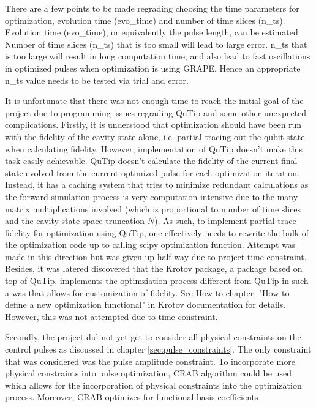 \documentclass[12pt]{report}
\begin{document}
There are a few points to be made regrading choosing the time parameters for optimization, evolution time (evo\_time) and number of time slices (n\_ts).
Evolution time (evo\_time), or equivalently the pulse length, can be estimated %
Number of time slices (n\_ts) that is too small will lead to large error. 
n\_ts that is too large will result in long computation time; and also lead to fast oscillations in optimized pulses when optimization is using GRAPE.
Hence an appropriate n\_ts value needs to be tested via trial and error.
\par
It is unfortunate that there was not enough time to reach the initial goal of the project due to programming issues regrading QuTip and some other unexpected complications.
Firstly, it is understood that optimization should have been run with the fidelity of the cavity state alone, i.e. partial tracing out the qubit state when calculating fidelity. 
However, implementation of QuTip doesn't make this task easily achievable. QuTip doesn't calculate the fidelity of the current final state evolved from the current optimized pulse for each optimization iteration. 
Instead, it has a caching system that tries to minimize redundant calculations as the forward simulation process is very computation intensive due to the many matrix multiplications involved (which is proportional to number of time slices and the cavity state space truncation $N$).
As such, to implement partial trace fidelity for optimization using QuTip, one effectively needs to rewrite the bulk of the optimization code up to calling scipy optimization function. 
Attempt was made in this direction but was given up half way due to project time constraint. 
Besides, it was latered discovered that the Krotov package, a package based on top of QuTip, implements the optimziation process different from QuTip in such a was that allows for customization of fidelity. 
See How-to chapter, "How to define a new optimization functional" in Krotov documentation for details.
However, this was not attempted due to time constraint.
\par
Secondly, the project did not yet get to consider all physical constraints on the control pulses as discussed in chapter \ref{sec:pulse_constraints}.
The only constraint that was considered was the pulse amplitude constraint. To incorporate more physical constraints into pulse optimization, CRAB algorithm 
could be used which allows for the incorporation of physical constraints into the optimization process. Moreover, CRAB optimizes for functional basis coefficients 
\end{document}

